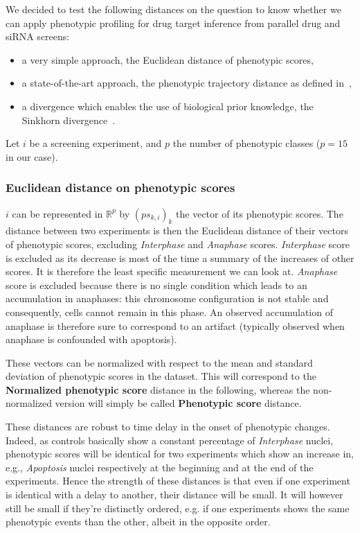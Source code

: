We decided to test the following distances on the question to know whether we can apply phenotypic profiling for drug target inference from parallel drug and siRNA screens:
\begin{itemize}
\item a very simple approach, the Euclidean distance of phenotypic scores, 
\item a state-of-the-art approach, the phenotypic trajectory distance as defined in~\cite{Walter2010},
\item a divergence which enables the use of biological prior knowledge, the Sinkhorn divergence~\cite{sinkhorn}.
\end{itemize}

Let $i$ be a screening experiment, and $p$ the number of phenotypic classes ($p=15$ in our case). 
\subsubsection{Euclidean distance on phenotypic scores}
$i$ can be represented in $\mathbb{R}^p$ by $(ps_{k,i})_k$ the vector
of its phenotypic scores. The distance between two experiments is then
the Euclidean distance of their vectors of phenotypic scores,
excluding \textit{Interphase} and \textit{Anaphase}
scores. \textit{Interphase} score is excluded as its decrease is most
of the time a summary of the increases of other scores. It is
therefore the least specific measurement we can look
at. \textit{Anaphase} score is excluded because there is no single
condition which leads to an accumulation in anaphases: this chromosome
configuration is not stable and consequently, cells cannot remain in
this phase. An observed accumulation of anaphase is therefore sure to
correspond to an artifact (typically observed when anaphase is
confounded with apoptosis). 

These vectors can be normalized with respect to the mean and standard deviation of phenotypic scores in the dataset. This will correspond to the \textbf{Normalized phenotypic score} distance in the following, whereas the non-normalized version will simply be called \textbf{Phenotypic score} distance.

These distances are robust to time delay in the onset of phenotypic changes. Indeed, as controls basically show a constant percentage of \textit{Interphase} nuclei, phenotypic scores will be identical for two experiments which show an increase in, e.g., \textit{Apoptosis} nuclei respectively at the beginning and at the end of the experiments. Hence the strength of these distances is that even if one experiment is identical with a delay to another, their distance will be small. It will however still be small if they're distinctly ordered, e.g. if one experiments shows the same phenotypic events than the other, albeit in the opposite order.

